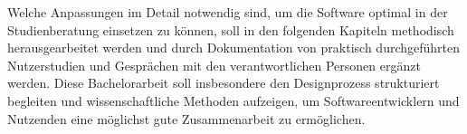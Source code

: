 Welche Anpassungen im Detail notwendig sind, um die Software optimal in der
Studienberatung einsetzen zu können, soll in den folgenden Kapiteln methodisch
herausgearbeitet werden und durch Dokumentation von praktisch durchgeführten
Nutzerstudien und Gesprächen mit den verantwortlichen Personen ergänzt werden.
Diese Bachelorarbeit soll insbesondere den Designprozess strukturiert begleiten
und wissenschaftliche Methoden aufzeigen, um Softwareentwicklern und Nutzenden
eine möglichst gute Zusammenarbeit zu ermöglichen.
